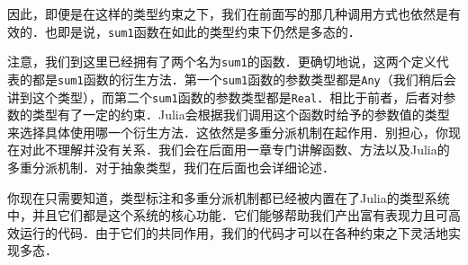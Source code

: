 因此，即便是在这样的类型约束之下，我们在前面写的那几种调用方式也依然是有效的．也即是说，\verb|sum1|函数在如此的类型约束下仍然是多态的．

注意，我们到这里已经拥有了两个名为\verb|sum1|的函数．更确切地说，这两个定义代表的都是\verb|sum1|函数的衍生方法．第一个\verb|sum1|函数的参数类型都是\verb|Any|（我们稍后会讲到这个类型），而第二个\verb|sum1|函数的参数类型都是\verb|Real|．相比于前者，后者对参数的类型有了一定的约束．Julia会根据我们调用这个函数时给予的参数值的类型来选择具体使用哪一个衍生方法．这依然是多重分派机制在起作用．别担心，你现在对此不理解并没有关系．我们会在后面用一章专门讲解函数、方法以及Julia的多重分派机制．对于抽象类型，我们在后面也会详细论述．

你现在只需要知道，类型标注和多重分派机制都已经被内置在了Julia的类型系统中，并且它们都是这个系统的核心功能．它们能够帮助我们产出富有表现力且可高效运行的代码．由于它们的共同作用，我们的代码才可以在各种约束之下灵活地实现多态．